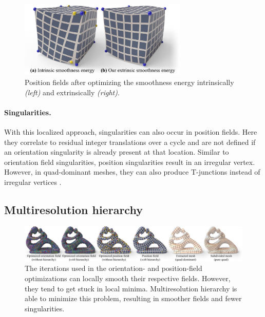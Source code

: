 \documentclass{ACGSeminar}
\begin{document}
\begin{figure}[htb!]
	\begin{centering}
		\includegraphics[width=8cm]{img/position-field-illustration.png}\par
	\end{centering}
	\caption{Position fields after optimizing the smoothness energy intrinsically \textit{(left)} and extrinsically \textit{(right)}. \cite{jakob2015instant}}
	\label{fig:position-field-illustration}
\end{figure}

\paragraph{Singularities.}
With this localized approach, singularities can also occur in position fields. Here they correlate to residual integer translations over a cycle and are not defined if an orientation singularity is already present at that location. Similar to orientation field singularities, position singularities result in an irregular vertex. However, in quad-dominant meshes, they can also produce T-junctions instead of irregular vertices \cite{jakob2015instant}.

\subsection{Multiresolution hierarchy}
\begin{figure}[htb!]
	\begin{centering}
		\includegraphics[width=\textwidth]{img/multiresolution-hierarchy.png}\par
	\end{centering}
	\caption{The iterations used in the orientation- and position-field optimizations can locally smooth their respective fields. However, they tend to get stuck in local minima. Multiresolution hierarchy is able to minimize this problem, resulting in smoother fields and fewer singularities. \cite{jakob2015instant}}
	\label{fig:multireolution-hierarchy}
\end{figure}
\end{document}
